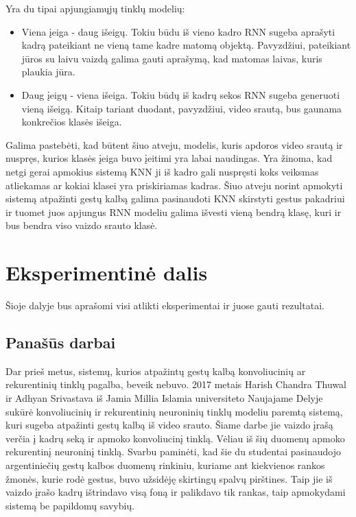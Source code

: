 \documentclass{VUMIFPSbakalaurinis}
\begin{document}
Yra du tipai apjungiamųjų tinklų modelių:
\begin{itemize}
	\item Viena įeiga - daug išeigų. Tokiu būdu iš vieno kadro RNN sugeba aprašyti kadrą pateikiant ne vieną tame kadre matomą objektą. Pavyzdžiui, pateikiant jūros su laivu vaizdą galima gauti aprašymą, kad matomas laivas, kuris plaukia jūra.
	\item Daug įeigų - viena išeiga. Tokiu būdų iš kadrų sekos RNN sugeba generuoti vieną išeigą. Kitaip tariant duodant, pavyzdžiui, video srautą, bus gaunama konkrečios klasės išeiga.
\end{itemize}

Galima pastebėti, kad būtent šiuo atveju, modelis, kuris apdoros video srautą ir nuspręs, kurios klasės įeiga buvo įeitimi yra labai naudingas. Yra žinoma, kad netgi gerai apmokius sistemą KNN ji iš kadro gali nuspręsti koks veiksmas atliekamas ar kokiai klasei yra priskiriamas kadras. Šiuo atveju norint apmokyti sistemą atpažinti gestų kalbą galima pasinaudoti KNN skirstyti gestus pakadriui ir tuomet juos apjungus RNN modeliu galima išvesti vieną bendrą klasę, kuri ir bus bendra viso vaizdo srauto klasė.


\section{Eksperimentinė dalis}

Šioje dalyje bus aprašomi visi atlikti eksperimentai ir juose gauti rezultatai.

\subsection{Panašūs darbai}
Dar prieš metus, sistemų, kurios atpažintų gestų kalbą konvoliucinių ar rekurentinių tinklų pagalba, beveik nebuvo. 2017 metais Harish Chandra Thuwal ir Adhyan Srivastava iš Jamia Millia Islamia universiteto Naujajame Delyje sukūrė konvoliucinių ir rekurentinių neuroninių tinklų modeliu paremtą sistemą, kuri sugeba atpažinti gestų kalbą iš video srauto. Šiame darbe jie vaizdo įrašą verčia į kadrų seką ir apmoko konvoliucinį tinklą. Vėliau iš šių duomenų apmoko rekurentinį neuroninį tinklą. Svarbu paminėti, kad šie du studentai pasinaudojo argentiniečių gestų kalbos duomenų rinkiniu, kuriame ant kiekvienos rankos žmonės, kurie rodė gestus, buvo užsidėję skirtingų spalvų pirštines. Taip jie iš vaizdo įrašo kadrų ištrindavo visą foną ir palikdavo tik rankas, taip apmokydami sistemą be papildomų savybių.
\end{document}
